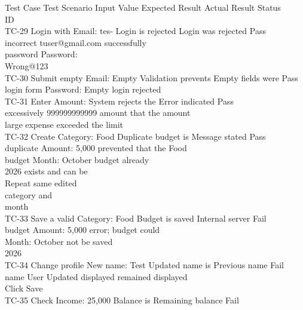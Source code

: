 \documentclass[12pt,a4paper]{report}
\begin{document}
\smallskip
Test Case Test Scenario Input Value           Expected Result Actual Result             Status\\ 
ID\\ 
TC-29     Login with      Email: tes-         Login is rejected   Login was rejected Pass\\ 
incorrect       tuser@gmail.com                         successfully\\ 
password        Password:\\ 
Wrong@123\\ 
TC-30     Submit empty Email: Empty           Validation prevents Empty fields were     Pass\\ 
login form      Password: Empty     login               rejected\\ 
TC-31     Enter           Amount:             System rejects the Error indicated        Pass\\ 
excessively     999999999999        amount              that the amount\\ 
large expense                                           exceeded the limit\\ 
TC-32     Create          Category: Food      Duplicate budget is Message stated        Pass\\ 
duplicate       Amount: 5,000       prevented           that the Food\\ 
budget          Month: October                          budget already\\ 
2026                                    exists and can be\\ 
Repeat same                             edited\\ 
category and\\ 
month\\ 
TC-33     Save a valid    Category: Food      Budget is saved     Internal server       Fail\\ 
budget          Amount: 5,000                           error; budget could\\ 
Month: October                          not be saved\\ 
2026\\ 
TC-34     Change profile New name: Test       Updated name is     Previous name         Fail\\ 
name            User Updated        displayed           remained displayed\\ 
Click Save\\ 
TC-35     Check           Income: 25,000      Balance is          Remaining balance Fail\\ 
\end{document}
